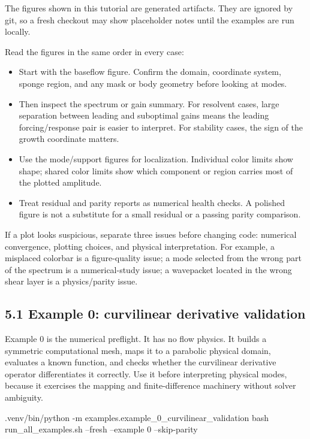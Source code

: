 \documentclass[11pt,a4paper]{article}
\begin{document}
\begin{warningbox}
The figures shown in this tutorial are generated artifacts. They are ignored by git, so a fresh checkout may show placeholder notes until the examples are run locally.
\end{warningbox}

Read the figures in the same order in every case:

\begin{itemize}[leftmargin=2em]
  \item Start with the baseflow figure. Confirm the domain, coordinate system, sponge region, and any mask or body geometry before looking at modes.
  \item Then inspect the spectrum or gain summary. For resolvent cases, large separation between leading and suboptimal gains means the leading forcing/response pair is easier to interpret. For stability cases, the sign of the growth coordinate matters.
  \item Use the mode/support figures for localization. Individual color limits show shape; shared color limits show which component or region carries most of the plotted amplitude.
  \item Treat residual and parity reports as numerical health checks. A polished figure is not a substitute for a small residual or a passing parity comparison.
\end{itemize}

If a plot looks suspicious, separate three issues before changing code: numerical convergence, plotting choices, and physical interpretation. For example, a misplaced colorbar is a figure-quality issue; a mode selected from the wrong part of the spectrum is a numerical-study issue; a wavepacket located in the wrong shear layer is a physics/parity issue.

\subsection*{5.1 Example 0: curvilinear derivative validation}

Example 0 is the numerical preflight. It has no flow physics. It builds a symmetric computational mesh, maps it to a parabolic physical domain, evaluates a known function, and checks whether the curvilinear derivative operator differentiates it correctly. Use it before interpreting physical modes, because it exercises the mapping and finite-difference machinery without solver ambiguity.

\begin{commandbox}
.venv/bin/python -m examples.example_0_curvilinear_validation
bash run_all_examples.sh --fresh --example 0 --skip-parity
\end{commandbox}
\end{document}
